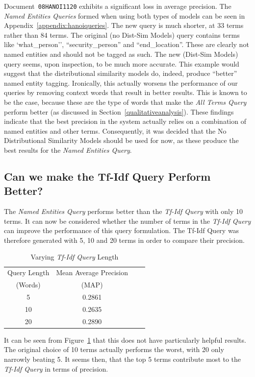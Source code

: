 \documentclass{l4proj}
\newcommand{\code}[1]{\texttt{#1}}
\begin{document}
Document~\code{08HANOI1120} exhibits a significant loss in average precision. The \textit{Named Entities Queries} formed when using both types of models can be seen in Appendix~\ref{appendix:hanoiqueries}.
The new query is much shorter, at 33 terms rather than 84 terms. The original (no Dist-Sim Models) query contains terms like `what\_person'', ``security\_person'' and ``end\_location''. These are clearly not named entities and should not be tagged as such. The new (Dist-Sim Models) query seems, upon inspection, to be much more accurate. This example would suggest that the distributional similarity models do, indeed, produce ``better'' named entity tagging. Ironically, this actually worsens the performance of our queries by removing context words that result in better results. This is known to be the case, because these are the type of words that make the \textit{All Terms Query} perform better (as discussed in Section~\ref{qualitativeanalysis}).
These findings indicate that the best precision in the system actually relies on a combination of named entities and other terms. Consequently, it was decided that the No Distributional Similarity Models should be used for now, as these produce the best results for the \textit{Named Entities Query}.
\subsection{Can we make the Tf-Idf Query Perform Better?}
The \textit{Named Entities Query} performs better than the \textit{Tf-Idf Query} with only 10 terms. It can now be considered whether the number of terms in the \textit{Tf-Idf Query} can improve the performance of this query formulation. The Tf-Idf Query was therefore generated with 5, 10 and 20 terms in order to compare their precision.
\begin{table}[H]
\centering
\begin{tabular}{|c|c|c|c|}
\hline
Query Length 	& Mean Average Precision	\\ 
(Words) 		& (MAP) 					\\ \hline
5             	& 0.2861 					\\ \hline
10        		& 0.2635 					\\ \hline
20 				& 0.2890 					\\ \hline
\end{tabular}
\caption{Varying \textit{Tf-Idf Query} Length}
\label{tfidflengthresults}
\end{table}
It can be seen from Figure~\ref{tfidflengthresults} that this does not have particularly helpful results. The original choice of 10 terms actually performs the worst, with 20 only narrowly beating 5. It seems then, that the top 5 terms contribute most to the \textit{Tf-Idf Query} in terms of precision.
\end{document}
